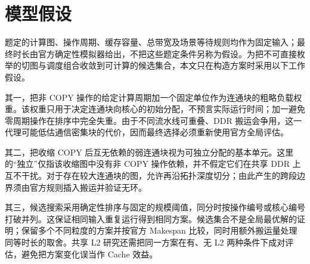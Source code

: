 \section{模型假设}

题定的计算图、操作周期、缓存容量、总带宽及场景等待规则均作为固定输入；最终时长由官方确定性模拟器给出，不把这些题定条件另称为假设。为把不可直接枚举的切图与调度组合收敛到可计算的候选集合，本文只在构造方案时采用以下工作假设。

其一，把非 COPY 操作的给定计算周期加一个固定单位作为连通块的粗略负载权重。该权重只用于决定连通块向核心的初始分配，不预言实际运行时间；加一避免零周期操作在排序中完全失重。由于不同流水线可重叠、DDR 搬运会争用，这一代理可能低估通信密集块的代价，因而最终选择必须重新使用官方全局评估。

其二，把收缩 COPY 后互无依赖的弱连通块视为可独立分配的基本单元。这里的“独立”仅指该收缩图中没有非 COPY 操作依赖，并不假定它们在共享 DDR 上互不干扰。对于存在较大连通块的图，允许再沿拓扑深度切分；由此产生的跨段边界须由官方规则插入搬运并验证无环。

其三，候选搜索采用确定性排序与固定的规模阈值，同分时按操作编号或核心编号打破并列。这保证相同输入重复运行得到相同方案。候选集合不是全局最优解的证明；保留多个不同粒度的方案并按官方 Makespan 比较，同时用额外搬运量处理同等时长的取舍。共享 L2 研究还需把同一方案在有、无 L2 两种条件下成对评估，避免把方案变化误当作 Cache 效益。
